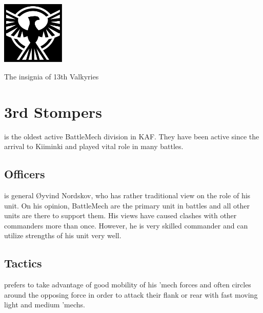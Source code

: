 \documentclass{tufte-book}
\begin{document}
\bigskip
{}

\begin{marginfigure}[0\baselineskip]
  \includegraphics[width=3cm]{condor-emblem}
  \caption{The insignia of 13th Valkyries}
  \label{fig:valkyries}
\end{marginfigure}


\section{3rd Stompers}

 is the oldest active BattleMech division in KAF.
They have been active since the arrival to Kiiminki and played vital role in
many battles.

\subsection{Officers}

 is general \O yvind Nordskov, who
has rather traditional view on the role of his unit. On his opinion,
BattleMech are the primary unit in battles and all other units are there to
support them. His views have caused clashes with other commanders more than
once. However, he is very skilled commander and can utilize strengths of his
unit very well.

\subsection{Tactics}

 prefers to take advantage of good mobility of
his 'mech forces and often circles around the opposing force in order to
attack their flank or rear with fast moving light and medium 'mechs.
\end{document}
